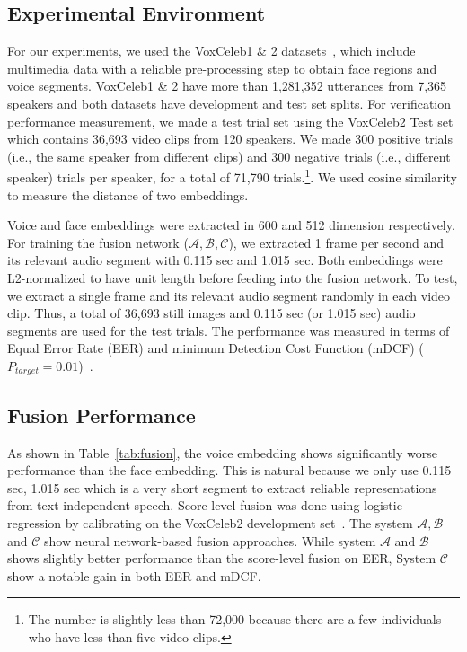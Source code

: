 \documentclass{article}
\begin{document}
\subsection{Experimental Environment}\label{sec:exp_env}
For our experiments, 
we used the VoxCeleb1 \& 2 datasets~\cite{Nagraniy2017,Chung2018}, which include multimedia data with a reliable pre-processing step to obtain face regions and voice segments.
VoxCeleb1 \& 2 have more than 1,281,352 utterances from 7,365 speakers and both datasets have development and test set splits.
For verification performance measurement, we made a test trial set using the VoxCeleb2 Test set which contains 36,693 video clips from 120 speakers. 
We made 300 positive trials (i.e., the same speaker from different clips) and 300 negative trials (i.e., different speaker) trials per speaker, for a total of 71,790 trials.\footnote{The number is slightly less than 72,000 because there are a few individuals who have less than five video clips.}. We used cosine similarity to measure the distance of two embeddings.

Voice and face embeddings were extracted in 600 and 512 dimension respectively. For training the fusion network ($\mathcal{A},\mathcal{B},\mathcal{C}$), we extracted 1 frame per second and its relevant audio segment with 0.115 sec and 1.015 sec. Both embeddings were L2-normalized to have unit length before feeding into the fusion network. To test, we extract a single frame and its relevant audio segment randomly in each video clip. Thus, a total of 36,693 still images and 0.115 sec (or 1.015 sec) audio segments are used for the test trials. The performance was measured in terms of Equal Error Rate (EER) and minimum Detection Cost Function (mDCF) ($P_\textit{target}=0.01$)~\cite{sre16}. 

\subsection{Fusion Performance}\label{sec:exp_fusion}
As shown in Table~\ref{tab:fusion}, the voice embedding shows significantly worse performance than the face embedding. This is natural because we only use 0.115 sec, 1.015 sec which is a very short segment to extract reliable representations from text-independent speech.  Score-level fusion was done using logistic regression by calibrating on the VoxCeleb2 development set~\cite{Brummer2006}. The system $\mathcal{A, B}$ and $\mathcal{C}$ show neural network-based fusion approaches. While system $\mathcal{A}$ and $\mathcal{B}$ shows slightly better performance than the score-level fusion on EER, System $\mathcal{C}$ show a notable gain in both EER and mDCF.
\end{document}
